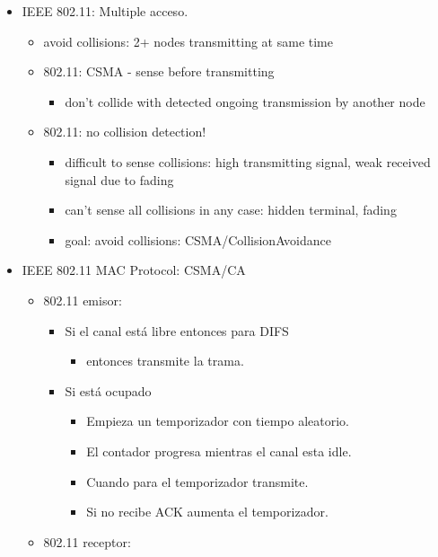 \documentclass[12pt, twoside, openright]{report} %
\begin{document}
\begin{itemize}
	\item IEEE 802.11: Multiple acceso.

	      \begin{itemize}
		      \item avoid collisions: 2+ nodes transmitting at same time
		      \item 802.11: CSMA - sense before transmitting

		            \begin{itemize}
			            \item don't collide with detected ongoing transmission by
			                  another node
		            \end{itemize}
		      \item 802.11: no collision detection!

		            \begin{itemize}
			            \item difficult to sense collisions: high transmitting signal,
			                  weak received signal due to fading
			            \item can't sense all collisions in any case: hidden terminal,
			                  fading
			            \item goal: avoid collisions: CSMA/CollisionAvoidance
		            \end{itemize}
	      \end{itemize}
	      \pagebreak

	\item IEEE 802.11 MAC Protocol: CSMA/CA

	      \begin{itemize}
		      \item 802.11 emisor:

		            \begin{itemize}
			            \item Si el canal está libre entonces para DIFS

			                  \begin{itemize}
				                  \item entonces transmite la trama.
			                  \end{itemize}
			            \item Si está ocupado

			                  \begin{itemize}
				                  \item Empieza un temporizador con tiempo aleatorio.
				                  \item El contador progresa mientras el canal esta idle.
				                  \item Cuando para el temporizador transmite.
				                  \item Si no recibe ACK aumenta el temporizador.
			                  \end{itemize}
		            \end{itemize}
		      \item 802.11 receptor:


\end{itemize}
\end{itemize}
\end{document}
